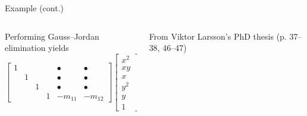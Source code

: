 \documentclass[aspectratio=169]{beamer}
\begin{document}
\begin{frame}[t]{Example (cont.)}
\vspace{1cm}
\begin{columns}
    \begin{column}{0.7\textwidth}
        Performing Gauss--Jordan elimination yields
        \begin{equation*}
            \begin{bmatrix}
                1&&& & \bullet & \bullet\\
                &1&& & \bullet & \bullet\\
                &&1& & \bullet & \bullet \\
                &&&1 & - m_{11} & -m_{12}
            \end{bmatrix}
            \begin{bmatrix}
                x^2 \\ xy \\ x \\ y^2 \\ y \\ 1
            \end{bmatrix}
            = 0
        \end{equation*}
    \end{column}%
    \begin{column}{0.3\textwidth}
        \centering
        

        \vspace{5mm}

        {\scriptsize From Viktor Larsson's PhD thesis (p. 37--38, 46--47)}
    \end{column}
\end{columns}
\end{frame}
\end{document}
